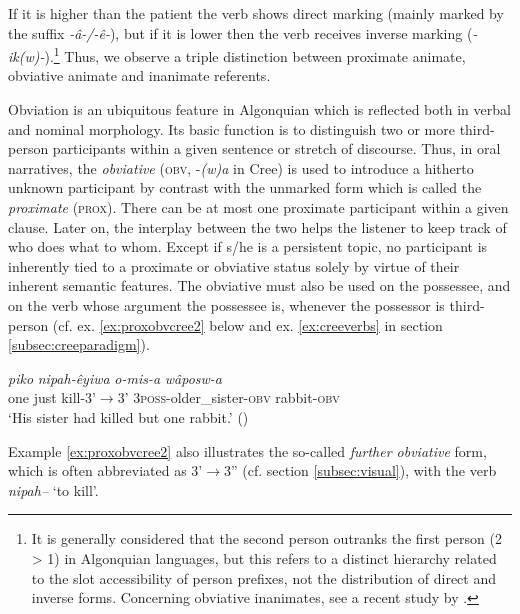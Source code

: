 \documentclass[twoside,a4paper,11pt]{article}
\newcommand{\ipa}[1]{{\phon\textit{#1}}}
\newcommand{\Σ}{\greek{Σ}}
\newcommand{\obv}{\textsc{obv}}
\newcommand{ \prox}{\textsc{prox}}
\begin{document}
If it is higher than the patient the verb shows direct marking (mainly marked by the suffix \ipa{-â-/-ê-}), but if it is lower then the verb receives inverse marking (\ipa{-ik(w)-}).\footnote{It is generally considered that the second person outranks the first person (2 > 1) in Algonquian languages, but this refers to a distinct hierarchy related to the slot accessibility of person prefixes, not the distribution of direct and inverse forms. Concerning obviative inanimates, see a recent study by \citet{muehlbauer12obviation}.} Thus, we observe a triple distinction between proximate animate, obviative animate and inanimate referents.

Obviation is an ubiquitous feature in Algonquian which is reflected both in verbal and nominal morphology. Its basic function is to distinguish two or more third-person participants within a given sentence or stretch of discourse. Thus, in oral narratives, the \textit{obviative} (\obv, -\textit{(w)a} in Cree) is used to introduce a hitherto unknown participant by contrast with the unmarked form which is called the \textit{proximate} (\prox). There can be  at most one proximate participant within a given clause. Later on, the interplay between the two helps the listener to keep track of who does what to whom. Except if s/he is a persistent topic, no participant is inherently tied to a proximate or obviative status solely by virtue of their inherent semantic features. The obviative must also be used on the possessee, and on the verb whose argument the possessee is, whenever the possessor is third-person (cf. ex. \ref{ex:proxobvcree2} below and ex. \ref{ex:creeverbs} in section \ref{subsec:creeparadigm}).

\begin{exe}
\ex \label{ex:proxobvcree2}
\gll \ipa{pêyak}  \ipa{piko}	\ipa{nipah-êyiwa}  \ipa{o-mis-a} \ipa{wâposw-a}  \\
one just kill-3'$\rightarrow$3'  3\textsc{poss}-older\_sister-\textsc{obv} rabbit-\textsc{obv}\\
\glt  `His sister had killed but one rabbit.'  (\citealp[p. 401]{wolfart96sketch})
\end{exe}

Example \ref{ex:proxobvcree2} also illustrates the so-called \textit{further obviative} form, which is often abbreviated as 3'$\rightarrow$3'' (cf. section \ref{subsec:visual}), with the verb \ipa{nipah--} `to kill'. 
\end{document}
